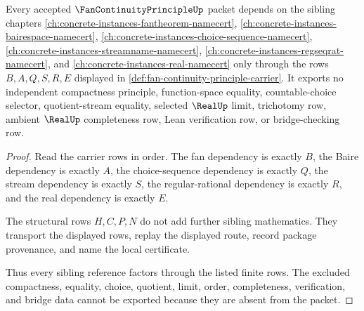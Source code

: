 \begin{theorem}
\label{thm:fan-continuity-principle-sibling-dependency}
Every accepted $\FanContinuityPrincipleUp$ packet depends on the sibling chapters \autoref{ch:concrete-instances-fantheorem-namecert}, \autoref{ch:concrete-instances-bairespace-namecert}, \autoref{ch:concrete-instances-choice-sequence-namecert}, \autoref{ch:concrete-instances-streamname-namecert}, \autoref{ch:concrete-instances-regseqrat-namecert}, and \autoref{ch:concrete-instances-real-namecert} only through the rows $B,A,Q,S,R,E$ displayed in \autoref{def:fan-continuity-principle-carrier}. It exports no independent compactness principle, function-space equality, countable-choice selector, quotient-stream equality, selected $\RealUp$ limit, trichotomy row, ambient $\RealUp$ completeness row, Lean verification row, or bridge-checking row.
\end{theorem}
\begin{proof}
Read the carrier rows in order. The fan dependency is exactly $B$, the Baire dependency is exactly $A$, the choice-sequence dependency is exactly $Q$, the stream dependency is exactly $S$, the regular-rational dependency is exactly $R$, and the real dependency is exactly $E$.

The structural rows $H,C,P,N$ do not add further sibling mathematics. They transport the displayed rows, replay the displayed route, record package provenance, and name the local certificate.

Thus every sibling reference factors through the listed finite rows. The excluded compactness, equality, choice, quotient, limit, order, completeness, verification, and bridge data cannot be exported because they are absent from the packet.
\end{proof}


